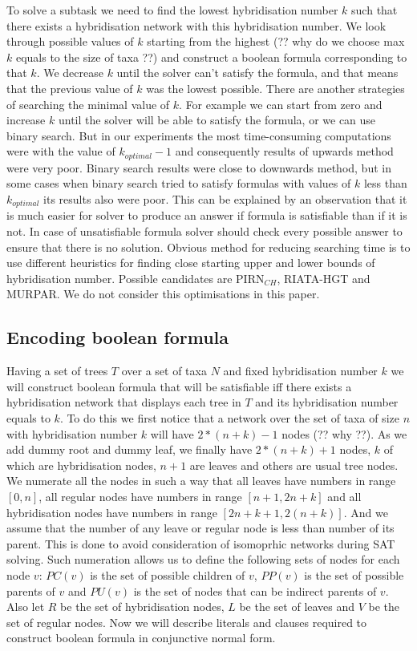 \documentclass[runningheads, envcountsame, a4paper]{llncs}
\begin{document}
To solve a subtask we need to find the lowest hybridisation number $k$ such that there exists a hybridisation 
network with this hybridisation number. We look through possible values of $k$ starting from the highest (?? why do 
we choose max $k$ equals to the size of taxa ??) and construct a boolean formula corresponding to that $k$. 
We decrease $k$ until the solver can't satisfy the formula, and that means that the previous value of $k$ was the 
lowest possible. There are another strategies of searching the minimal value of $k$. For example we can start from 
zero and increase $k$ until the solver will be able to satisfy the formula, or we can use binary search. But in our 
experiments the most time-consuming computations were with the value of $k_{optimal} - 1$ and consequently results of 
upwards method were very poor. Binary search results were close to downwards method, but in some cases when binary search 
tried to satisfy formulas with values of $k$ less than $k_{optimal}$ its results also were poor. This can be explained by 
an observation that it is much easier for solver to produce an answer if formula is satisfiable than if it is not. In case 
of unsatisfiable formula solver should check every possible answer to ensure that there is no solution. Obvious method 
for reducing searching time is to use different heuristics for finding close starting upper and lower bounds of 
hybridisation number. Possible candidates are PIRN$_{CH}$, RIATA-HGT and MURPAR. We do not consider this optimisations in this paper.

\subsection{Encoding boolean formula}

Having a set of trees $T$ over a set of taxa $N$ and fixed hybridisation number $k$ we will construct boolean formula 
that will be satisfiable iff there exists a hybridisation network that displays each tree in $T$ and its hybridisation 
number equals to $k$. To do this we first notice that a network over the set of taxa of size $n$ with hybridisation number 
$k$ will have $2 * (n + k) - 1$ nodes (?? why ??). As we add dummy root and dummy leaf, we finally have $2 * (n + k) + 1$ nodes, 
$k$ of which are hybridisation nodes, $n + 1$ are leaves and others are usual tree nodes. We numerate all the nodes in such a way 
that all leaves have numbers in range $[0,n]$, all regular nodes have numbers in range $[n + 1,2n + k]$ and all hybridisation nodes have numbers 
in range $[2n + k + 1, 2(n + k)]$. And we assume that the number of any leave or regular node is less than number of its parent. This is done to 
avoid consideration of isomoprhic networks during SAT solving. Such numeration allows us to define the following sets of nodes for each node 
$v$: $PC(v)$ is the set of possible children of $v$, $PP(v)$ is the set of possible parents of $v$ and $PU(v)$ is the set of nodes that can 
be indirect parents of $v$. Also let $R$ be the set of hybridisation nodes, $L$ be the set of leaves and $V$ be the set of regular nodes. 
Now we will describe literals and clauses required to construct boolean formula in conjunctive normal form.
\end{document}
